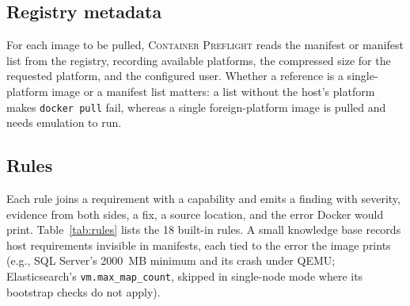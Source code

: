 \documentclass[preprint,12pt]{elsarticle}
\newcommand{\tool}{\textsc{Container Preflight}}
\begin{document}
\subsection{Registry metadata}
For each image to be pulled, \tool{} reads the manifest or manifest list from the registry, recording available platforms, the compressed size for the requested platform, and the configured user. Whether a reference is a single-platform image or a manifest list matters: a list without the host's platform makes \texttt{docker pull} fail, whereas a single foreign-platform image is pulled and needs emulation to run.

\subsection{Rules}
Each rule joins a requirement with a capability and emits a finding with severity, evidence from both sides, a fix, a source location, and the error Docker would print. Table~\ref{tab:rules} lists the 18 built-in rules. A small knowledge base records host requirements invisible in manifests, each tied to the error the image prints (e.g., SQL Server's 2000~MB minimum and its crash under QEMU; Elasticsearch's \texttt{vm.max\_map\_count}, skipped in single-node mode where its bootstrap checks do not apply).
\end{document}
